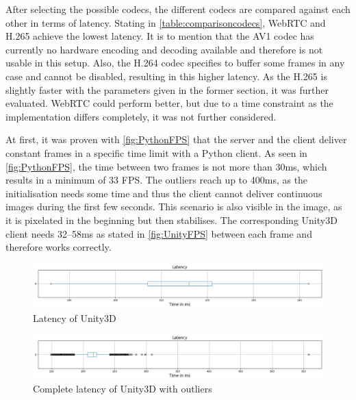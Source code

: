 \par
After selecting the possible codecs, the different codecs are compared against each other in terms of latency. Stating in \autoref{table:comparisoncodecs}, WebRTC and H.265 achieve the lowest latency. It is to mention that the AV1 codec has currently no hardware encoding and decoding available and therefore is not usable in this setup. Also, the H.264 codec specifies to buffer some frames in any case and cannot be disabled, resulting in this higher latency. As the H.265 is slightly faster with the parameters given in the former section, it was further evaluated. WebRTC could perform better, but due to a time constraint as the implementation differs completely, it was not further considered.
\par

\par
At first, it was proven with \autoref{fig:PythonFPS} that the server and the client deliver constant frames in a specific time limit with a Python client. As seen in \autoref{fig:PythonFPS}, the time between two frames is not more than 30ms, which results in a minimum of 33 FPS. The outliers reach up to 400ms, as the initialisation needs some time and thus the client cannot deliver continuous images during the first few seconds. This scenario is also visible in the image, as it is pixelated in the beginning but then stabilises. The corresponding Unity3D client needs 32–58ms as stated in \autoref{fig:UnityFPS} between each frame and therefore works correctly.

\begin{figure}[htbp]
    \includegraphics[width=\textwidth,height=\textheight,keepaspectratio]{logos/Unity3dWithoutOutliers.png}
    \caption{Latency of Unity3D}
    \label{fig:UnityLatenyVRWithoutOutliers}
\end{figure}

\begin{figure}[htbp]
    \includegraphics[width=\textwidth,height=\textheight,keepaspectratio]{logos/Unity3dWithOutliers.png}
    \caption{Complete latency of Unity3D with outliers}
    \label{fig:UnityLatenyVRWithOutliers}
\end{figure}

